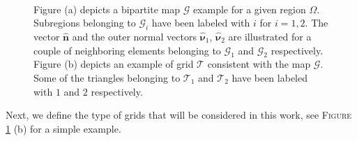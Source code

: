 \documentclass[3p]{elsarticle}
\def\n{\bm{\widehat{ n} } }
\def\outer{\bm {\widehat{\nu} } }
\def\triang{\mathcal{T}}
\def\tone{\mathcal{T}_{1} }%
\def\ttwo{\mathcal{T}_{2}} %
\def\map{\mathcal{G} }%
\def\mapone{\mathcal{G}_{1} }%
\def\maptwo{\mathcal{G}_{2}} %
\begin{document}
%
%
%
%
\begin{figure}[h] %
	\centering
	\begin{subfigure}[Bipartite Map $\map$ of region $\Omega$. ]
			{ \texttt{[image: BipartiteMap.pdf]}  }
	\end{subfigure} %
	~ %
	\begin{subfigure}[Grid $\triang$ consistent with $\map$.]
			{\texttt{[image: ConsistentGrid.pdf]} }                
	\end{subfigure} %
	\caption{Figure (a) depicts a bipartite map $\map$ example for a given region $\Omega$. Subregions belonging to $\map_{i}$ have been labeled with $i$ for $i = 1,2$. The vector $\n$ and the outer normal vectors $\outer_{1}$, $\outer_{2}$ are illustrated for a couple of neighboring elements belonging to $\mapone$ and $\maptwo$ respectively. 
	Figure (b) depicts an example of grid $\triang$ consistent with the map $\map$. Some of the triangles belonging to $\tone$ and $\ttwo$ have been labeled with $1$ and $2$ respectively. \label{Fig Bipartite Map and Consistent Grid} }
\end{figure}
%
%
Next, we define the type of grids that will be considered in this work, see \textsc{Figure} \ref{Fig Bipartite Map and Consistent Grid} (b) for a simple example.
%
%
\end{document}
